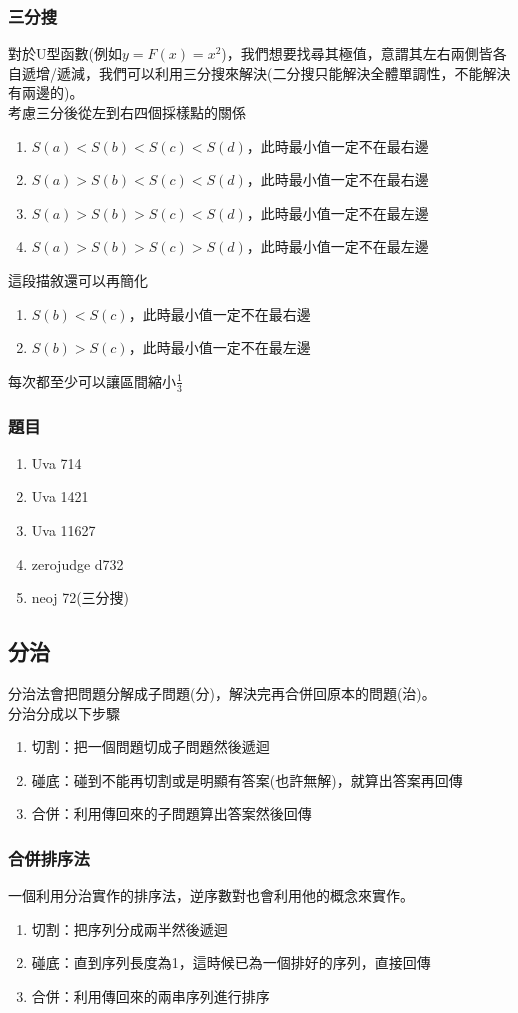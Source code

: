 \subsubsection{三分搜}
對於U型函數(例如$y=F(x)=x^2$)，我們想要找尋其極值，意謂其左右兩側皆各自遞增/遞減，我們可以利用三分搜來解決(二分搜只能解決全體單調性，不能解決有兩邊的)。\\
考慮三分後從左到右四個採樣點的關係
\begin{enumerate}
\item $S(a) < S(b) < S(c) < S(d)$，此時最小值一定不在最右邊
\item $S(a) > S(b) < S(c) < S(d)$，此時最小值一定不在最右邊
\item $S(a) > S(b) > S(c) < S(d)$，此時最小值一定不在最左邊
\item $S(a) > S(b) > S(c) > S(d)$，此時最小值一定不在最左邊
\end{enumerate}
這段描敘還可以再簡化
\begin{enumerate}
\item $S(b) < S(c)$，此時最小值一定不在最右邊
\item $S(b) > S(c)$，此時最小值一定不在最左邊
\end{enumerate}
每次都至少可以讓區間縮小$\frac{1}{3}$

\subsubsection{題目}
\begin{enumerate}
\item Uva 714
\item Uva 1421
\item Uva 11627
\item zerojudge d732
\item neoj 72(三分搜)
\end{enumerate}
\subsection{分治}
分治法會把問題分解成子問題(分)，解決完再合併回原本的問題(治)。\\
分治分成以下步驟
\begin{enumerate}
\item 切割：把一個問題切成子問題然後遞迴
\item 碰底：碰到不能再切割或是明顯有答案(也許無解)，就算出答案再回傳
\item 合併：利用傳回來的子問題算出答案然後回傳
\end{enumerate}
\subsubsection{合併排序法}
一個利用分治實作的排序法，逆序數對也會利用他的概念來實作。
\begin{enumerate}
\item 切割：把序列分成兩半然後遞迴
\item 碰底：直到序列長度為1，這時候已為一個排好的序列，直接回傳
\item 合併：利用傳回來的兩串序列進行排序
\end{enumerate}

